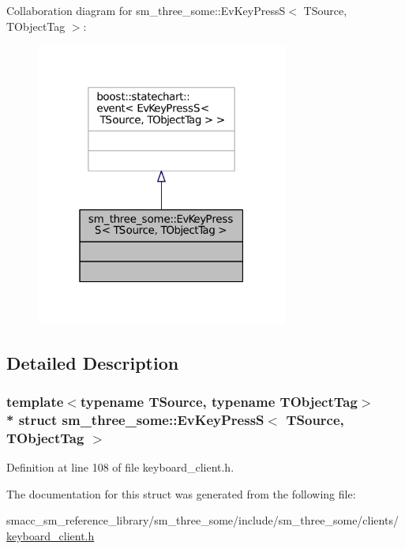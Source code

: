Collaboration diagram for sm\+\_\+three\+\_\+some\+:\+:Ev\+Key\+PressS$<$ T\+Source, T\+Object\+Tag $>$\+:
\nopagebreak
\begin{figure}[H]
\begin{center}
\leavevmode
\includegraphics[width=235pt]{structsm__three__some_1_1EvKeyPressS__coll__graph}
\end{center}
\end{figure}


\subsection{Detailed Description}
\subsubsection*{template$<$typename T\+Source, typename T\+Object\+Tag$>$\\*
struct sm\+\_\+three\+\_\+some\+::\+Ev\+Key\+Press\+S$<$ T\+Source, T\+Object\+Tag $>$}



Definition at line 108 of file keyboard\+\_\+client.\+h.



The documentation for this struct was generated from the following file\+:\begin{DoxyCompactItemize}
\item 
smacc\+\_\+sm\+\_\+reference\+\_\+library/sm\+\_\+three\+\_\+some/include/sm\+\_\+three\+\_\+some/clients/\hyperlink{keyboard__client_8h}{keyboard\+\_\+client.\+h}\end{DoxyCompactItemize}

